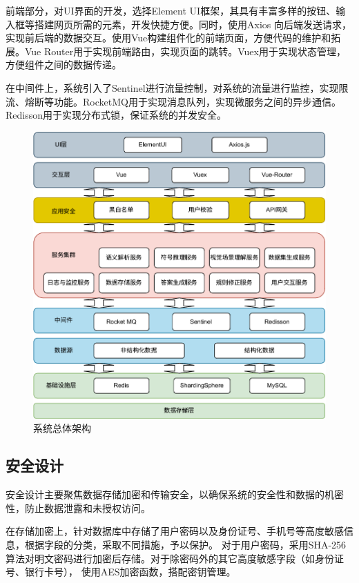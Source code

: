 前端部分，对UI界面的开发，选择Element UI框架，其具有丰富多样的按钮、输入框等搭建网页所需的元素，开发快捷方便。同时，使用Axios
向后端发送请求，实现前后端的数据交互。使用Vue构建组件化的前端页面，方便代码的维护和拓展。Vue Router用于实现前端路由，实现页面的跳转。Vuex用于实现状态管理，方便组件之间的数据传递。

在中间件上，系统引入了Sentinel进行流量控制，对系统的流量进行监控，实现限流、熔断等功能。RocketMQ用于实现消息队列，实现微服务之间的异步通信。
Redisson用于实现分布式锁，保证系统的并发安全。
\begin{figure}[h]
    \centering
    \includegraphics[scale=0.9]{figures/system_architecture-crop.pdf}
    \caption{系统总体架构}
    \label{fig:overall_architecture}
\end{figure}
\subsection{安全设计}
安全设计主要聚焦数据存储加密和传输安全，以确保系统的安全性和数据的机密性，防止数据泄露和未授权访问。

在存储加密上，针对数据库中存储了用户密码以及身份证号、手机号等高度敏感信息，根据字段的分类，采取不同措施，予以保护。
对于用户密码，采用SHA-256算法对明文密码进行加密后存储。对于除密码外的其它高度敏感字段（如身份证号、银行卡号），
使用AES加密函数，搭配密钥管理。

